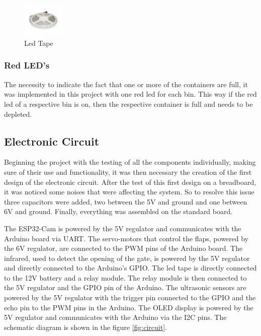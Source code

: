 \documentclass[a4paper,11pt]{article}
\begin{document}
\begin{figure}[H]
  \centering
  \includegraphics[width=2cm]{Figures/ledtape.jpg}
  \caption{\small{Led Tape}}
  \label{fig:ledtape}
\end{figure}

\subsubsection{Red LED's}
\label{subsubsec:redleds}
The necessity to indicate the fact that one or more of the containers are full, it was implemented in this project with one red led for each bin. This way if the red led of a respective bin is on, then the respective container is full and needs to be depleted.

\subsection{Electronic Circuit}
Beginning the project with the testing of all the components individually, making sure of their use and functionality, it was then necessary the creation of the first design of the electronic circuit. After the test of this first design on a breadboard, it was noticed some noises that were affecting the system. So to resolve this issue three capacitors were added, two between the 5V and ground and one between 6V and ground. Finally, everything was assembled on the standard board.

The ESP32-Cam is powered by the 5V regulator and communicates with the Arduino board via UART. The servo-motors that control the flaps, powered by the 6V regulator, are connected to the PWM pins of the Arduino board. The infrared, used to detect the opening of the gate, is powered by the 5V regulator and directly connected to the Arduino's GPIO. The led tape is directly connected to the 12V battery and a relay module. The relay module is then connected to the 5V regulator and the GPIO pin of the Arduino. The ultrasonic sensors are powered by the 5V regulator with the trigger pin connected to the GPIO and the echo pin to the PWM pins in the Arduino. The OLED display is powered by the 5V regulator and communicates with the Arduino via the I2C pins. The schematic diagram is shown in the figure \ref{fig:circuit}.
\end{document}
